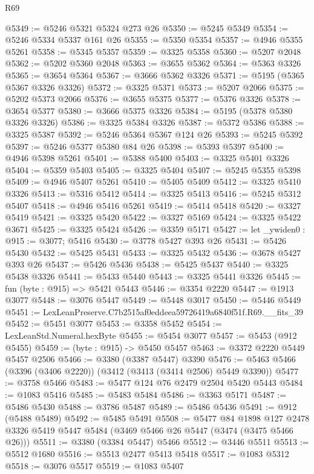 \begin{lexlean}{R69}
\begin{coremodule}
@5349 := @5246 @5321 @5324 @273 @26
@5350 := @5245 @5349
@5354 := @5246 @5334 @5337 @161 @26
@5355 := @5350 @5354
@5357 := @4946 @5355 @5261
@5358 := @5345 @5357
@5359 := @3325 @5358
@5360 := @5207 @2048
@5362 := @5202 @5360 @2048
@5363 := @3655 @5362
@5364 := @5363 @3326
@5365 := @3654 @5364
@5367 := @3666 @5362 @3326
@5371 := @5195 (@5365 @5367 @3326 @3326)
@5372 := @3325 @5371
@5373 := @5207 @2066
@5375 := @5202 @5373 @2066
@5376 := @3655 @5375
@5377 := @5376 @3326
@5378 := @3654 @5377
@5380 := @3666 @5375 @3326
@5384 := @5195 (@5378 @5380 @3326 @3326)
@5386 := @3325 @5384 @3326
@5387 := @5372 @5386
@5388 := @3325 @5387
@5392 := @5246 @5364 @5367 @124 @26
@5393 := @5245 @5392
@5397 := @5246 @5377 @5380 @84 @26
@5398 := @5393 @5397
@5400 := @4946 @5398 @5261
@5401 := @5388 @5400
@5403 := @3325 @5401 @3326
@5404 := @5359 @5403
@5405 := @3325 @5404
@5407 := @5245 @5355 @5398
@5409 := @4946 @5407 @5261
@5410 := @5405 @5409
@5412 := @3325 @5410 @3326
@5413 := @5316 @5412
@5414 := @3325 @5413
@5416 := @5245 @5312 @5407
@5418 := @4946 @5416 @5261
@5419 := @5414 @5418
@5420 := @3327 @5419
@5421 := @3325 @5420
@5422 := @3327 @5169
@5424 := @3325 @5422 @3671
@5425 := @3325 @5424
@5426 := @3359 @5171
@5427 := let _ywiden0 : @915 := @3077; @5416
@5430 := @3778 @5427 @393 @26
@5431 := @5426 @5430
@5432 := @5425 @5431
@5433 := @3325 @5432
@5436 := @3678 @5427 @393 @26
@5437 := @5426 @5436
@5438 := @5425 @5437
@5440 := @3325 @5438 @3326
@5441 := @5433 @5440
@5443 := @3325 @5441 @3326
@5445 := fun (byte : @915) => @5421 @5443
@5446 := @3354 @2220
@5447 := @1913 @3077
@5448 := @3076 @5447
@5449 := @5448 @3017
@5450 := @5446 @5449
@5451 := LexLeanPreserve.C7b2515af0eddeea59726419a6840f51f.R69.__fits_39
@5452 := @5451 @3077
@5453 := @3358 @5452
@5454 := LexLeanStd.Numeral.hexByte
@5455 := @5454 @3077
@5457 := @5453 (@912 @5455)
@5459 := (byte : @915) -> @5450 @5457
@5463 := @3372 @2220 @5449 @5457 @2506
@5466 := @3380 (@3387 @5447) @3390
@5476 := @5463 @5466 (@3396 (@3406 @2220)) (@3412 (@3413 (@3414 @2506) @5449 @3390))
@5477 := @3758 @5466
@5483 := @5477 @124 @76 @2479 @2504 @5420 @5443
@5484 := @1083 @5416
@5485 := @5483 @5484
@5486 := @3363 @5171
@5487 := @5486 @5430
@5488 := @3786 @5487
@5489 := @5486 @5436
@5491 := @912 (@5488 @5489)
@5492 := @5485 @5491
@5508 := @5477
    @84
    @1898
    @127
    @2478
    @3326
    @5419
    @5447
    @5484
    (@3469 @5466 @26 @5447 (@3474 (@3475 @5466 @26)))
@5511 := @3380 (@3384 @5447) @5466
@5512 := @3446 @5511
@5513 := @5512 @1680
@5516 := @5513 @2477 @5413 @5418
@5517 := @1083 @5312
@5518 := @3076 @5517
@5519 := @1083 @5407

\end{coremodule}
\end{lexlean}
